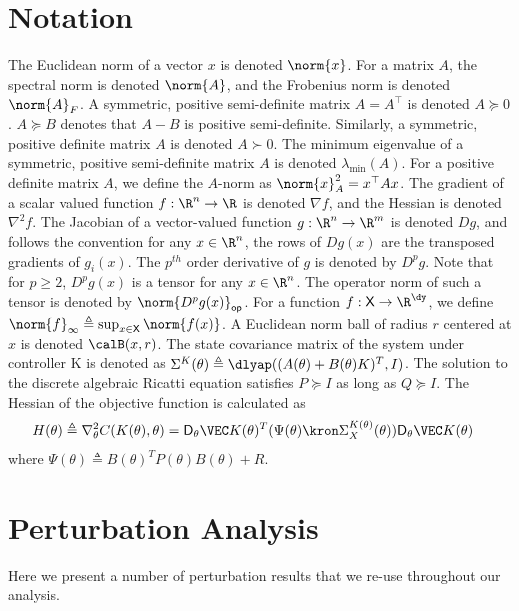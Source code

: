 \appendix

\section{Notation}
The Euclidean norm of a vector $x$ is denoted $\norm{x}$. For a matrix $A$, the spectral norm is denoted $\norm{A}$, and the Frobenius norm is denoted $\norm{A}_F$. 
A symmetric, positive semi-definite matrix $A = A^\top$ is denoted $A \succeq 0$.  $A \succeq B$ denotes that $A-B$ is positive semi-definite. Similarly, a symmetric, positive definite matrix $A$ is denoted $A \succ 0$. 
The minimum eigenvalue of a symmetric, positive semi-definite matrix $A$ is denoted $\lambda_{\min}(A)$. For a positive definite matrix $A$, we define the $A$-norm as $\norm{x}_A^2 = x^\top A x$. 
The gradient of a scalar valued function $f: \R^n \to \R$ is denoted $\nabla f$, and the Hessian is denoted $\nabla^2 f$. 
The Jacobian of a vector-valued function $g: \R^n \to \R^m$ is denoted $D g$, and follows the convention for any $x\in\R^n$, the rows of $D g(x)$ are the transposed gradients of $g_i(x)$.
The $p^{th}$ order derivative of $g$  is  denoted by $D^{p} g$. Note that for $p \geq 2$, $D^{p} g(x)$ is a tensor for any $x\in\R^{n}$. 
The operator norm of such a tensor is denoted by $\norm{D^p g(x)}_{\mathsf{op}}$. 
For a function $f: \mathsf{X} \to \R^{\dy}$, we define $\norm{f}_{\infty} \triangleq \sup_{x \in \mathsf{X}} \norm{f(x)}$. 
A Euclidean norm ball of radius $r$ centered at $x$ is denoted $\calB(x,r)$. The state covariance matrix of the system under controller K is denoted as $\Sigma^K(\theta) \triangleq \dlyap((A(\theta)+B(\theta)K)^T, I )$. 
The solution to the discrete algebraic Ricatti equation satisfies $P \succeq I$ as long as $Q\succeq I$. 
The Hessian of the objective function is calculated as 
\begin{align*}
 H(\theta) &\triangleq \nabla^2_\theta C(K(\theta), \theta) = \mathsf{D}_{\theta}\VEC K(\theta)^T(\Psi(\theta)\kron\Sigma_X^{K(\theta)}(\theta))\mathsf{D}_{\theta}\VEC K(\theta)
\end{align*}
where $\Psi(\theta) \triangleq B(\theta)^TP(\theta)B(\theta) + R$.


\section{Perturbation Analysis}





Here we present a number of perturbation results that we re-use throughout our analysis.

